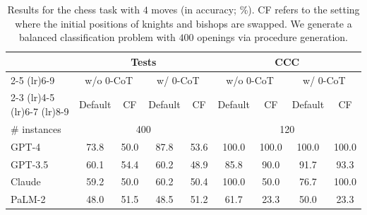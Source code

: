 \begin{table}[t!]
    \centering
    \begin{tabular}{lcccccccc}
        \toprule
        & \multicolumn{4}{c}{Tests} & \multicolumn{4}{c}{CCC} \\
        \cmidrule(lr){2-5}
        \cmidrule(lr){6-9}
        & \multicolumn{2}{c}{w/o 0-CoT} & \multicolumn{2}{c}{w/ 0-CoT} & \multicolumn{2}{c}{w/o 0-CoT} & \multicolumn{2}{c}{w/ 0-CoT} \\
        \cmidrule(lr){2-3}
        \cmidrule(lr){4-5}
        \cmidrule(lr){6-7}
        \cmidrule(lr){8-9} 
        & Default & CF & Default & CF & Default & CF & Default & CF \\
        \midrule
        \# instances & \multicolumn{4}{c}{400} & \multicolumn{4}{c}{120} \\
        \midrule
        GPT-4 & 73.8 & 50.0 & 87.8 & 53.6 & 100.0 & 100.0 & 100.0 & 100.0 \\
        GPT-3.5 & 60.1 & 54.4 & 60.2 & 48.9 & \phantom{0}85.8 & \phantom{0}90.0 & \phantom{0}91.7 & \phantom{0}93.3 \\
        Claude & 59.2 & 50.0 & 60.2 & 50.4 & 100.0 & \phantom{0}50.0 & \phantom{0}76.7 & 100.0 \\
        PaLM-2 & 48.0 & 51.5 & 48.5 & 51.2 & \phantom{0}61.7 & \phantom{0}23.3 & \phantom{0}50.0 & \phantom{0}23.3 \\
        \bottomrule
    \end{tabular}
    \caption{
    Results for the chess task with $4$ moves (in accuracy; \%). CF refers to the setting where the initial positions of knights and bishops are swapped. We generate a balanced classification problem with $400$ openings via procedure generation.
    }
\end{table}
